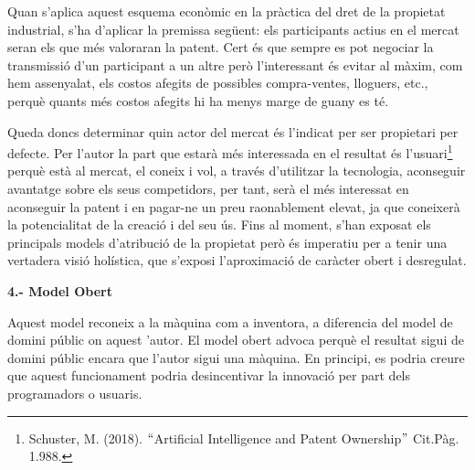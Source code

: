 \documentclass[12pt]{article}
\renewcommand{\_}{\kern-1.5pt\textunderscore\kern-1.5pt}
\begin{document}
\begin{itemize}
\vspace{\baselineskip}
\begin{justify}
Quan s’aplica aquest esquema econòmic en la pràctica del dret de la propietat industrial, s’ha d’aplicar la premissa següent: els participants actius en el mercat seran els que més valoraran la patent. Cert és que sempre es pot negociar la transmissió d’un participant a un altre però l’interessant és evitar al màxim, com hem assenyalat, els costos afegits de possibles compra-ventes, lloguers, etc., perquè quants més costos afegits hi ha menys marge de guany es té.
\end{justify}\par


\vspace{\baselineskip}

\vspace{\baselineskip}

\vspace{\baselineskip}
\begin{justify}
Queda doncs determinar quin actor del mercat és l’indicat per ser propietari per defecte. Per l’autor la part que estarà més interessada en el resultat és l’usuari\footnote{ Schuster, M. (2018). $``$Artificial Intelligence and Patent Ownership$"$  Cit.Pàg. 1.988. } perquè està al mercat, el coneix i vol, a través d’utilitzar la tecnologia, aconseguir avantatge sobre els seus competidors, per tant, serà el més interessat en aconseguir la patent i en pagar-ne un preu raonablement elevat, ja que coneixerà la potencialitat de la creació i del seu ús.  Fins al moment, s’han exposat els principals models d’atribució de la propietat però és imperatiu per a tenir una vertadera visió holística, que s’exposi l’aproximació de caràcter obert i desregulat.
\end{justify}\par


\vspace{\baselineskip}
\begin{justify}
\textbf{4.- Model Obert}
\end{justify}\par


\vspace{\baselineskip}
\begin{justify}
Aquest model reconeix a la màquina com a inventora, a diferencia del model de domini públic on aquest ’autor.  El model obert advoca perquè el resultat sigui de domini públic encara que l’autor sigui una màquina. En principi, es podria creure que aquest funcionament podria desincentivar la innovació per part dels programadors o usuaris. 
\end{justify}\par



\end{itemize}
\end{document}
